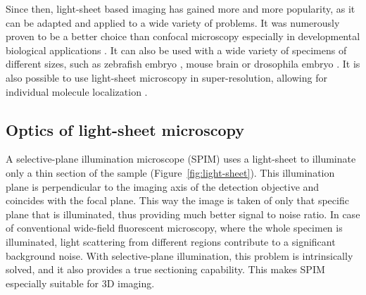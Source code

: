   Since then, light-sheet based imaging has gained more and more popularity, as it can be adapted and applied to a wide variety of problems. It was numerously proven to be a better choice than confocal microscopy \cite{reynaud_light_2008,huisken_selective_2009} especially in developmental biological applications \cite{weber_light_2011}. It can also be used with a wide variety of specimens of different sizes, such as zebrafish embryo \cite{keller_reconstruction_2008}, mouse brain \cite{dodt_ultramicroscopy:_2007} or drosophila embryo \cite{krzic_multiview_2012}. It is also possible to use light-sheet microscopy in super-resolution, allowing for individual molecule localization \cite{cella_zanacchi_live-cell_2011}.


  \subsection{Optics of light-sheet microscopy}

    A selective-plane illumination microscope (SPIM) uses a light-sheet to illuminate only a thin section of the sample (Figure~\ref{fig:light-sheet}). This illumination plane is perpendicular to the imaging axis of the detection objective and coincides with the focal plane. This way the image is taken of only that specific plane that is illuminated, thus providing much better signal to noise ratio. In case of conventional wide-field fluorescent microscopy, where the whole specimen is illuminated, light scattering from different regions contribute to a significant background noise. With selective-plane illumination, this problem is intrinsically solved, and it also provides a true sectioning capability. This makes SPIM especially suitable for 3D imaging.



